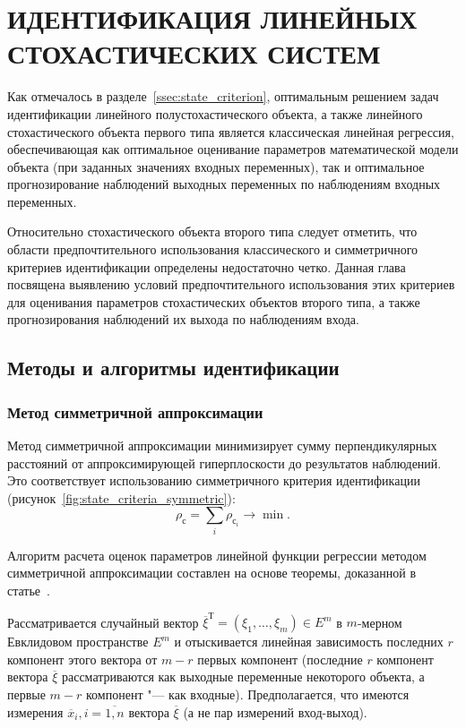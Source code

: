 \chapter[Идентификация линейных стохастических систем]{%
  ИДЕНТИФИКАЦИЯ ЛИНЕЙНЫХ \\
  СТОХАСТИЧЕСКИХ СИСТЕМ
}

Как отмечалось в разделе~\ref{ssec:state_criterion},
оптимальным решением задач идентификации линейного полустохастического объекта,
а также линейного стохастического объекта первого типа является классическая линейная регрессия,
обеспечивающая как оптимальное оценивание параметров математической модели объекта
(при заданных значениях входных переменных),
так и оптимальное прогнозирование наблюдений выходных переменных по наблюдениям входных переменных.

Относительно стохастического объекта второго типа следует отметить,
что области предпочтительного использования классического и симметричного критериев идентификации
определены недостаточно четко.
Данная глава посвящена выявлению условий предпочтительного использования этих критериев
для оценивания параметров стохастических объектов второго типа,
а также прогнозирования наблюдений их выхода по наблюдениям входа.

\vspace{2\baselineskip}
\section{Методы и алгоритмы идентификации}

\subsection{Метод симметричной аппроксимации}\label{ssec:linear_method_symmetric}

Метод симметричной аппроксимации минимизирует сумму перпендикулярных расстояний
от аппроксимирующей гиперплоскости до результатов наблюдений.
Это соответствует использованию симметричного критерия идентификации
(рисунок~\ref{fig:state_criteria_symmetric}):
\begin{equation*}
  \rho_{\text{с}} = \sum_i \rho_{\text{с}_i} \rightarrow \min.
\end{equation*}

Алгоритм расчета оценок параметров линейной функции регрессии
методом симметричной аппроксимации составлен на основе теоремы, доказанной в статье~\cite{mukha_2016}.

Рассматривается случайный вектор \( \overline{\xi}^{\text{Т}} = (\xi_1, \ldots, \xi_m ) \in E^m \)
в \( m \)-мерном Евклидовом пространстве \( E^m \) и отыскивается линейная
зависимость последних \( r \) компонент этого вектора от \( m - r \) первых компонент
(последние \( r \) компонент вектора \( \overline{\xi} \) рассматриваются как выходные
переменные некоторого объекта, а первые \( m - r \) компонент "--- как входные).
Предполагается, что имеются измерения \( \overline{x}_i, i = \overline{1, n} \)
вектора \( \overline{\xi} \) (а не пар измерений вход-выход).

